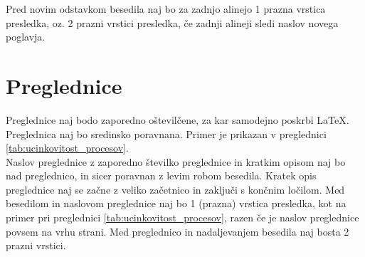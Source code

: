 Pred novim odstavkom besedila naj bo za zadnjo alinejo 1 prazna vrstica presledka, oz. 2 prazni vrstici presledka, če zadnji alineji sledi naslov novega poglavja.

\section{Preglednice}\label{sec:preglednice}

Preglednice naj bodo zaporedno oštevilčene, za kar samodejno poskrbi \LaTeX. Preglednica naj bo sredinsko poravnana. Primer je prikazan v preglednici \ref{tab:ucinkovitost_procesov}.\\

Naslov preglednice z zaporedno številko preglednice in kratkim opisom naj bo nad preglednico, in sicer poravnan z levim robom besedila. Kratek opis preglednice naj se začne z veliko začetnico in zaključi s končnim ločilom. Med besedilom in naslovom preglednice naj bo 1 (prazna) vrstica presledka, kot na primer pri preglednici \ref{tab:ucinkovitost_procesov}, razen če je naslov preglednice povsem na vrhu strani. Med preglednico in nadaljevanjem besedila naj bosta 2 prazni vrstici.\\

